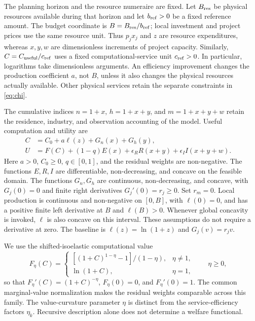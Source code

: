 \documentclass[11pt,a4paper]{article}
\theoremstyle{definition}\newtheorem{definition}{Definition}
\begin{document}
The planning horizon and the resource numeraire are fixed. Let
$B_{\rm res}$ be physical resources available during that horizon and let
$b_{\rm ref}>0$ be a fixed reference amount. The budget coordinate is
$B=B_{\rm res}/b_{\rm ref}$; local investment and project prices use the
same resource unit. Thus $p_jx_j$ and $z$ are resource expenditures, whereas
$x,y,w$ are dimensionless increments of project capacity. Similarly,
$C=C_{\rm useful}/c_{\rm ref}$ uses a fixed computational-service unit
$c_{\rm ref}>0$. In particular, logarithms take dimensionless arguments.
An efficiency improvement changes the production coefficient $a$, not
$B$, unless it also changes the physical resources actually available.
Other physical services retain the separate constraints in \cref{eq:chi}.

The cumulative indices $n=1+x$, $h=1+x+y$, and $m=1+x+y+w$ retain the
residence, industry, and observation accounting of the model. Useful
computation and utility are
\begin{align}
 C&=C_0+a\ell(z)+G_n(x)+G_h(y),\label{eq:compute}\\
 U&=F(C)+(1-q)E(x)+\epsilon_RR(x+y)
       +\epsilon_II(x+y+w).\label{eq:utility}
\end{align}
Here $a>0$, $C_0\geq0$, $q\in[0,1]$, and the residual weights are
non-negative. The functions $E,R,I$ are differentiable, non-decreasing,
and concave on the feasible domain. The functions $G_n,G_h$ are
continuous, non-decreasing, and concave, with $G_j(0)=0$ and finite right
derivatives $G_j'(0)=r_j\geq0$. Set $r_m=0$. Local production is continuous
and non-negative on $[0,B]$, with $\ell(0)=0$, and has a positive finite
left derivative at $B$ and $\ell(B)>0$. Whenever global concavity is
invoked, $\ell$ is also concave on this interval. These assumptions do
not require a derivative at zero. The baseline is
$\ell(z)=\ln(1+z)$ and $G_j(v)=r_jv$.

We use the shifted-isoelastic computational value
\begin{equation}
 F_\eta(C)=
 \begin{cases}
 [(1+C)^{1-\eta}-1]/(1-\eta),&\eta\ne1,\\
 \ln(1+C),&\eta=1,
 \end{cases}
 \qquad \eta\geq0,
 \label{eq:isoelastic}
\end{equation}
so that $F_\eta'(C)=(1+C)^{-\eta}$, $F_\eta(0)=0$, and
$F_\eta'(0)=1$. The common marginal-value normalization makes the
residual weights comparable across this family. The value-curvature
parameter $\eta$ is distinct from the service-efficiency factors $\eta_k$.
Recursive description alone does not determine a welfare functional.
\end{document}
